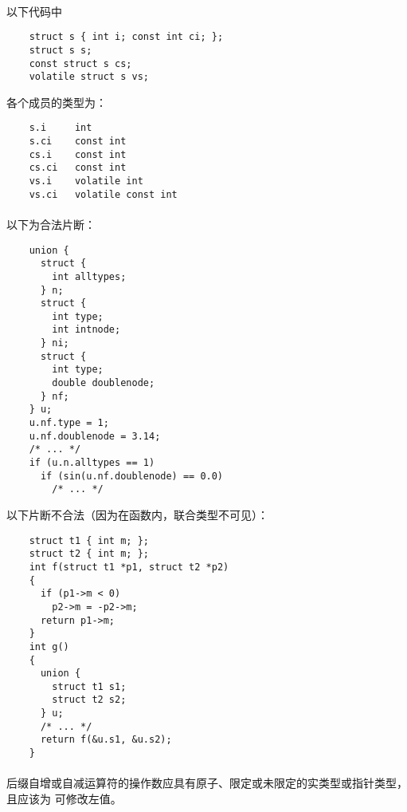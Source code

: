 {\paragraph{}
\ex 以下代码中
\begin{lstlisting}
    struct s { int i; const int ci; };
    struct s s;
    const struct s cs;
    volatile struct s vs;
\end{lstlisting}
各个成员的类型为：
\begin{lstlisting}
    s.i     int
    s.ci    const int
    cs.i    const int
    cs.ci   const int
    vs.i    volatile int
    vs.ci   volatile const int
\end{lstlisting}

\paragraph{}
\ex 以下为合法片断：
\begin{lstlisting}
    union {
      struct {
        int alltypes;
      } n;
      struct {
        int type;
        int intnode;
      } ni;
      struct {
        int type;
        double doublenode;
      } nf;
    } u;
    u.nf.type = 1;
    u.nf.doublenode = 3.14;
    /* ... */
    if (u.n.alltypes == 1)
      if (sin(u.nf.doublenode) == 0.0)
        /* ... */
\end{lstlisting}
以下片断不合法（因为在函数内，联合类型不可见）：
\begin{lstlisting}
    struct t1 { int m; };
    struct t2 { int m; };
    int f(struct t1 *p1, struct t2 *p2)
    {
      if (p1->m < 0)
        p2->m = -p2->m;
      return p1->m;
    }
    int g()
    {
      union {
        struct t1 s1;
        struct t2 s2;
      } u;
      /* ... */
      return f(&u.s1, &u.s2);
    }
\end{lstlisting}


\constraint
\paragraph{}
后缀自增或自减运算符的操作数应具有原子、限定或未限定的实类型或指针类型，且应该为
可修改左值。

\semantic
}

